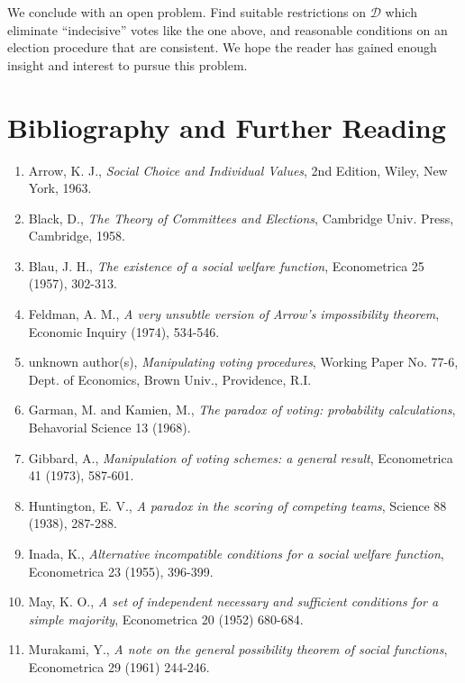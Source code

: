 \documentclass{article}
\begin{document}
\vspace{0.3cm}

We conclude with an open problem. Find suitable restrictions on $\mathcal{D}$ which eliminate ``indecisive'' votes like the one above, and reasonable conditions on an election procedure that are consistent. We hope the reader has gained enough insight and interest to pursue this problem.


\section*{Bibliography and Further Reading}

\begin{enumerate}[1.]
  \item Arrow, K. J., \emph{Social Choice and Individual Values}, 2nd Edition, Wiley, New York, 1963.
  \item Black, D., \emph{The Theory of Committees and Elections}, Cambridge Univ. Press, Cambridge, 1958.
  \item Blau, J. H., \emph{The existence of a social welfare function}, Econometrica 25 (1957), 302-313.
  \item Feldman, A. M., \emph{A very unsubtle version of Arrow's impossibility theorem}, Economic Inquiry (1974), 534-546.
  \item unknown author(s), \emph{Manipulating voting procedures}, Working Paper No. 77-6, Dept. of Economics, Brown Univ., Providence, R.I.
  \item Garman, M. and Kamien, M., \emph{The paradox of voting: probability calculations}, Behavorial Science 13 (1968).
  \item Gibbard, A., \emph{Manipulation of voting schemes: a general result}, Econometrica 41 (1973), 587-601.
  \item Huntington, E. V., \emph{A paradox in the scoring of competing teams}, Science 88 (1938), 287-288.
  \item Inada, K., \emph{Alternative incompatible conditions for a social welfare function}, Econometrica 23 (1955), 396-399.
  \item May, K. O., \emph{A set of independent necessary and sufficient conditions for a simple majority}, Econometrica 20 (1952) 680-684.
  \item Murakami, Y., \emph{A note on the general possibility theorem of social functions}, Econometrica 29 (1961) 244-246.

\end{enumerate}
\end{document}
